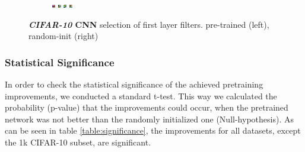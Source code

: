 \documentclass{article}
\begin{document}
\begin{figure}
\begin{subfigure}{.4\linewidth}
              \includegraphics[width=0.1\linewidth]{../graphics/cifar_filters/random_15.png}
              \includegraphics[width=0.1\linewidth]{../graphics/cifar_filters/random_16.png} %
              \includegraphics[width=0.1\linewidth]{../graphics/cifar_filters/random_17.png} %
              \includegraphics[width=0.1\linewidth]{../graphics/cifar_filters/random_18.png}
            \end{subfigure}

          \caption{\textbf{\emph{CIFAR-10} CNN} selection of first layer filters. pre-trained (left), random-init (right)}
          \label{fig:cifar_filters}

      \end{figure}



  \subsubsection{Statistical Significance}
    In order to check the statistical significance of the achieved pretraining improvements, we conducted a standard t-test.
    This way we calculated the probability (p-value) that the improvements could occur, when the pretrained network was not better than the randomly initialized one (Null-hypothesis).
    As can be seen in table \ref{table:significance}, the improvements for all datasets, except the 1k CIFAR-10 subset, are significant.
\end{document}
